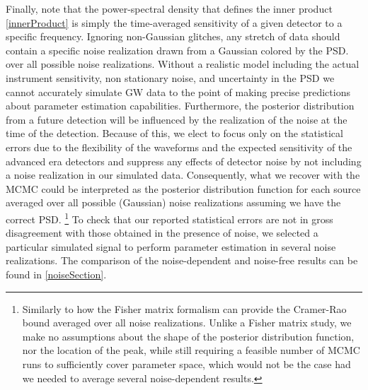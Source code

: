 \documentclass[11pt,a4paper]{emulateapj} 
\begin{document}
Finally, note that the power-spectral density that defines the inner
product \eqref{innerProduct} is simply the time-averaged sensitivity
of a given detector to a specific frequency.  Ignoring non-Gaussian
glitches, any stretch of data should contain a specific noise
realization drawn from a Gaussian colored by the PSD.
over all possible noise realizations. Without a realistic model
including the actual instrument sensitivity, non stationary noise, and
uncertainty in the PSD we cannot accurately simulate GW data to the
point of making precise predictions about parameter estimation
capabilities.  Furthermore, the posterior distribution from a future
detection will be influenced by the realization of the noise at the
time of the detection.  Because of this, we elect to focus only on the
statistical errors due to the flexibility of the waveforms and the
expected sensitivity of the advanced era detectors and suppress any
effects of detector noise by not including a noise realization in our
simulated data.  Consequently, what we recover with the MCMC could be
interpreted as the posterior distribution function for each source
averaged over all possible (Gaussian) noise realizations assuming we
have the correct PSD.  \footnote{Similarly to how the Fisher matrix
  formalism can provide the Cramer-Rao bound averaged over all noise
  realizations.  Unlike a Fisher matrix study, we make no assumptions
  about the shape of the posterior distribution function, nor the
  location of the peak, while still requiring a feasible number of
  MCMC runs to sufficiently cover parameter space, which would not be
  the case had we needed to average several noise-dependent results.}
To check that our reported statistical errors are not in gross
disagreement with those obtained in the presence of noise, we selected
a particular simulated signal to perform parameter estimation in
several noise realizations.  The comparison of the noise-dependent and
noise-free results can be found in \ref{noiseSection}.
\end{document}

